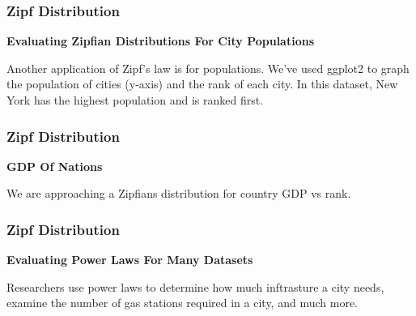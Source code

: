 \documentclass[MAIN.tex]{subfiles}
\begin{document}
\begin{frame}
\frametitle{Zipf Distribution}


\textbf{Evaluating Zipfian Distributions For City Populations}



Another application of Zipf’s law is for populations. 
We’ve used ggplot2 to graph the population of cities (y-axis) and the rank of each city. 
In this dataset, New York has the highest population and is ranked first. 


\end{frame}

\begin{frame}
\frametitle{Zipf Distribution}



\textbf{GDP Of Nations}



We are approaching a Zipfians distribution for country GDP vs rank. 


\end{frame}

\begin{frame}
\frametitle{Zipf Distribution}



\textbf{Evaluating Power Laws For Many Datasets}



Researchers use power laws to determine how much inftrasture a city needs, examine the number of gas stations required in a city, and much more. 



\end{frame}
\end{document}
